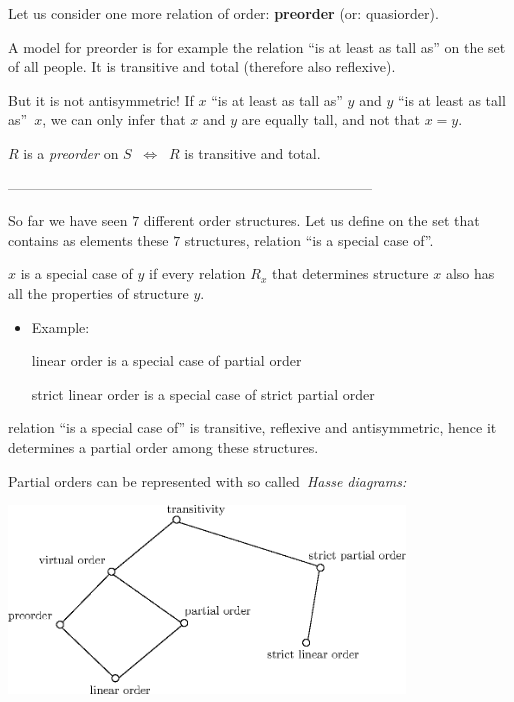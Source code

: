 \documentclass[11pt,paper=b5,footinclude,headinclude]{scrbook} %
\def\cee {{~\Leftrightarrow~}}
\theoremstyle{remark}
\theoremstyle{definition} %
\theoremstyle{theorem} %
\begin{document}
\bigskip

Let us consider one more relation of order: \textbf{ preorder} (or: quasiorder).

A model for preorder is for example the relation ``is at least as tall as'' on the set of all people.
It is transitive and total (therefore also reflexive).

But it is not antisymmetric!
If $x$ ``is at least as tall as'' $y$ and $y$ ``is at least as tall as''~$x$,
we can only infer that $x$ and $y$ are equally tall, and not that $x = y$.

$R$ is a {\em preorder} on $S$ $\cee$ $R$ is transitive and total.

\bigskip

------------------------------------------------------------------------------
\bigskip

So far we have seen $7$ different order structures.
Let us define on the set that contains as elements these $7$
structures, relation ``is a special case of''.

$x$ is a special case of $y$ if every relation $R_x$ that determines structure $x$
also has all the properties of structure $y$.

\begin{itemize}
  \item Example:

  linear order is a special case of partial order

  strict linear order is a special case of strict partial order
\end{itemize}

relation  ``is a special case of'' is transitive, reflexive and antisymmetric, hence it determines a partial
order among these structures.

Partial orders can be represented with so called~{\em Hasse diagrams:}

\begin{center}
\includegraphics[height=50mm]{strukture-en.eps}
\end{center}
\end{document}
